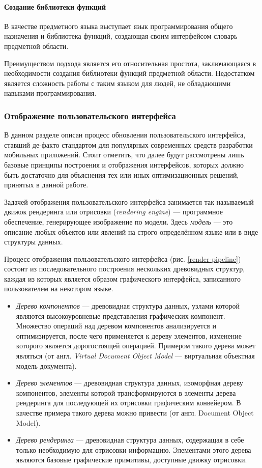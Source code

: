 \paragraph{Создание библиотеки функций}
В качестве предметного языка выступает язык программирования общего
назначения и библиотека функций, создающая своим интерфейсом словарь
предметной области.

Преимуществом подхода является его относительная простота, заключающаяся
в необходимости создания библиотеки функций предметной области. Недостатком
является сложность работы с таким языком для людей, не обладающими навыками
программирования.

\subsubsection{Отображение пользовательского интерфейса}
\label{section:render-pipeline}
В данном разделе описан процесс обновления пользовательского интерфейса,
ставший де-факто стандартом для популярных современных средств разработки
мобильных приложений. Стоит отметить, что далее будут рассмотрены лишь базовые принципы построения и отображения интерфейсов, которых должно быть
достаточно для объяснения тех или иных оптимизационных решений, принятых в
данной работе.

Задачей отображения пользовательского интерфейса занимается
так называемый движок рендеринга или отрисовки (\textit{ren\-dering engine})
--- программное обеспечение, генерирующее изображение по модели.
Здесь \textit{модель} --- это описание любых объектов или явлений на строго
определённом языке или в виде структуры данных.

Процесс отображения пользовательского интерфейса
(рис. \ref{render-pipeline}) состоит из последовательного построения
нескольких древовидных структур, каждая из которых является образом
графического интерфейса, записанного пользователем на некотором языке.
\begin{itemize}
	\item \textit{Дерево компонентов} --- древовидная структура данных,
	узлами которой являются	высокоуровневые представления графических
	компонент. Множество операций над деревом компонентов
	анализируется и оптимизируется, после чего применяется к дереву
	элементов, изменение которого является дорогостоящей операцией.
	Примером такого дерева может являться 
	(от англ. \textit{Virtual Document Object Model} --- виртуальная
	объектная модель документа).
	\item \textit{Дерево элементов} --- древовидная структура данных,
	изоморфная дереву компонентов, элементы которой
	трансформируются в элементы дерева рендеринга для последующей
	их отрисовки графическим конвейером. В качестве примера такого дерева
	можно привести  (от англ. Document Object Model).
	\item \textit{Дерево рендеринга} --- древовидная структура данных,
	содержащая в себе только необходимую для отрисовки информацию.
	Элементами этого дерева являются базовые графические примитивы,
	доступные движку отрисовки.
\end{itemize}

